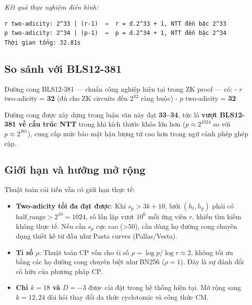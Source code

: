 \emph{Kết quả thực nghiệm điển hình:}

\begin{verbatim}
r two-adicity: 2^33 | (r-1)  →  r = d.2^33 + 1, NTT đến bậc 2^33
p two-adicity: 2^34 | (p-1)  →  p = d.2^34 + 1, NTT đến bậc 2^34
Thời gian tổng: 32.81s
\end{verbatim}

\subsection{So sánh với BLS12-381}\label{so-suxe1nh-vux1edbi-bls12-381}

Đường cong BLS12-381 \citep{BLS12_381} --- chuẩn công nghiệp hiện tại
trong ZK proof --- có: - \(r\) two-adicity = \textbf{32} (đủ cho ZK
circuits đến \(2^{32}\) ràng buộc) - \(p\) two-adicity = \textbf{32}

Đường cong được xây dựng trong luận văn này đạt \textbf{33--34}, tức là
\textbf{vượt BLS12-381 về cấu trúc NTT} trong khi kích thước khóa lớn
hơn (\(p \approx 2^{1024}\) so với \(p \approx 2^{381}\)), cung cấp mức
bảo mật hậu lượng tử cao hơn trong ngữ cảnh phép ghép cặp.

\subsection{Giới hạn và hướng mở
rộng}\label{giux1edbi-hux1ea1n-vuxe0-hux1b0ux1edbng-mux1edf-rux1ed9ng}

Thuật toán cải tiến vẫn có giới hạn thực tế:

\begin{itemize}
\tightlist
\item
  \textbf{Two-adicity tối đa đạt được}: Khi \(s_p > 3k + 10\), lưới
  \((h_t, h_y)\) phải có \(\text{half\_range} > 2^{10} = 1024\), số lần
  lặp vượt \(10^6\) mỗi ứng viên \(r\), khiến tìm kiếm không thực tế.
  Nếu cần \(s_p\) cực cao (\textgreater50), cần dùng họ đường cong
  chuyên dụng thiết kế từ đầu như Pasta curves (Pallas/Vesta).
\item
  \textbf{Tỉ số \(\rho\)}: Thuật toán CP vốn cho tỉ số
  \(\rho = \log p / \log r \approx 2\), không tối ưu bằng các họ đường
  cong chuyên biệt như BN256 (\(\rho = 1\)). Đây là sự đánh đổi cố hữu
  của phương pháp CP.
\item
  \textbf{Chỉ \(k=18\) và \(D=-3\)} được cài đặt trong hệ thống hiện
  tại. Mở rộng sang \(k = 12, 24\) đòi hỏi thay đổi đa thức cyclotomic
  và công thức CM.
\end{itemize}

\FloatBarrier
